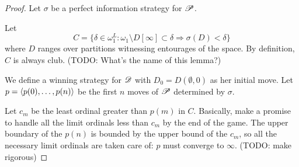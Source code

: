 \begin{proof}
  Let $\sigma$ be a perfect information strategy for $\mathscr{P}$.
  
  Let
  \[
    C 
      = 
    \{
      \delta\in\omega_1^L
        : 
      \omega_1\setminus D[\infty] \subset \delta
        \Rightarrow
      \sigma(D) < \delta
    \}
  \]
  where $D$ ranges over partitions witnessing entourages of the space.
  By definition, $C$ is always club. (TODO: What's the name of this
  lemma?)
  
  
  We define a winning strategy for $\mathscr{D}$ with $D_0=D(\emptyset,0)$ as her 
  initial move. Let $p=\langle p(0),\dots,p(n)\rangle$ be the first $n$ moves of $\mathscr{P}$ 
  determined by $\sigma$.
  
  Let $c_m$ be the least ordinal greater than $p(m)$ in $C$. Basically,
  make a promise to handle all the limit ordinals less than $c_m$ by the
  end of the game. The upper boundary of the $p(n)$ is bounded by the upper
  bound of the $c_m$, so all the necessary limit ordinals are taken care of:
  $p$ must converge to $\infty$. (TODO: make rigorous)
  
  
  
  
\end{proof}










